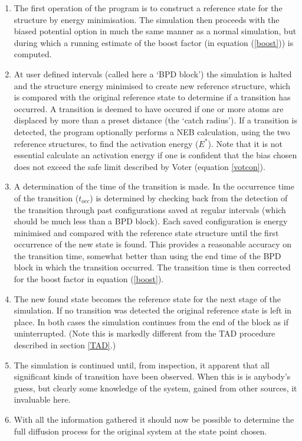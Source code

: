 \begin{enumerate}
\item The first operation of the program is to construct a reference 
state for the structure by energy minimisation.
The simulation then proceeds with the biased potential option in much
the same manner as a normal simulation, but during which a running
estimate of the boost factor (in equation (\ref{boost})) is computed. 
\item At user defined intervals (called here a `BPD block') the 
simulation is halted and the structure energy minimised to create new
reference structure, which is compared with the original reference
state to determine if a transition has occurred. A transition is
deemed to have occured if one or more atoms are displaced by more than
a preset distance (the `catch radius').  If a transition is
detected, the program optionally performs a NEB calculation, using the 
two reference structures, to find the activation energy ($E^{*}$). 
Note that it is not essential calculate an activation energy if one is
confident that the bias chosen does not exceed the safe limit described by
Voter (equation \ref{votcon}).
\item A determination of the time of the transition is made.
In \D{} the occurrence time of the transition ($t_{occ}$) is determined
by checking back from the detection of the transition through past
configurations saved at regular intervals (which should be much less
than a BPD block).  Each saved configuration is energy minimised and
compared with the reference state structure until the first occurrence
of the new state is found. This provides a reasonable accuracy on the
transition time, somewhat better than using the end time of the BPD
block in which the transition occurred. The transition time is
then corrected for the boost factor in equation (\ref{boost}).
\item The new found state becomes the reference state for the next stage of
the simulation. If no transition was detected the original reference state is
left in place.  In both cases the simulation continues
from the end of the block as if uninterrupted. (Note this 
is markedly different from the TAD procedure
described in section \ref{TAD}.)
\item The simulation is continued until, from inspection, it apparent 
that all significant kinds of transition have been observed. When this
is is anybody's guess, but clearly some knowledge of the system,
gained from other sources, it invaluable here.
\item With all the information gathered it should now be possible to 
determine the full diffusion process for the original system at the
state point chosen.
\end{enumerate}

